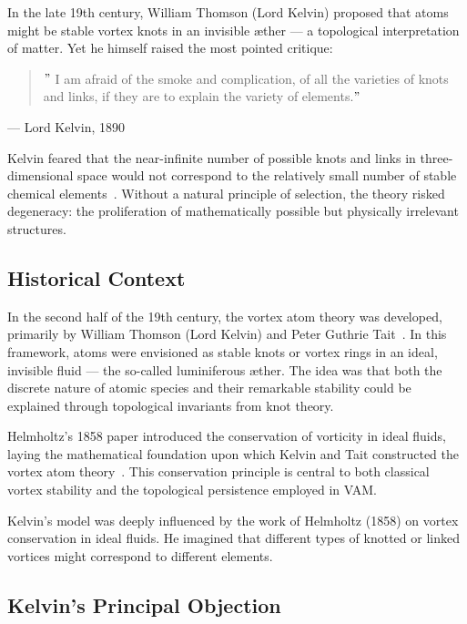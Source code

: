    In the late 19th century, William Thomson (Lord Kelvin) proposed that atoms might be stable vortex knots in an invisible æther — a topological interpretation of matter. Yet he himself raised the most pointed critique:

   \begin{quote}
   \("\) I am afraid of the smoke and complication, of all the varieties of knots and links, if they are to explain the variety of elements.\("\)
   \end{quote}
\hfill  — Lord Kelvin, 1890

   Kelvin feared that the near-infinite number of possible knots and links in three-dimensional space would not correspond to the relatively small number of stable chemical elements~\cite{thomson1890knots, tait1877knots}. Without a natural principle of selection, the theory risked degeneracy: the proliferation of mathematically possible but physically irrelevant structures.

   \subsection*{Historical Context}

   In the second half of the 19th century, the vortex atom theory was developed, primarily by William Thomson (Lord Kelvin) and Peter Guthrie Tait~\cite{thomson1890knots, tait1877knots}. In this framework, atoms were envisioned as stable knots or vortex rings in an ideal, invisible fluid — the so-called luminiferous æther. The idea was that both the discrete nature of atomic species and their remarkable stability could be explained through topological invariants from knot theory.

   Helmholtz's 1858 paper introduced the conservation of vorticity in ideal fluids, laying the mathematical foundation upon which Kelvin and Tait constructed the vortex atom theory~\cite{helmholtz1858vortices}. This conservation principle is central to both classical vortex stability and the topological persistence employed in VAM.

   Kelvin's model was deeply influenced by the work of Helmholtz (1858) on vortex conservation in ideal fluids. He imagined that different types of knotted or linked vortices might correspond to different elements.

   \subsection*{Kelvin's Principal Objection}


